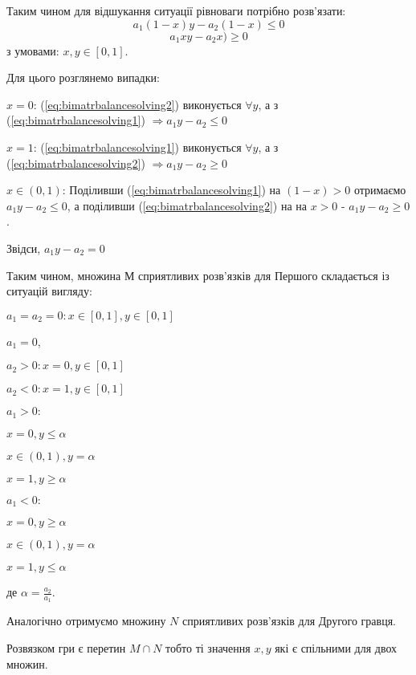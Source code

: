 \documentclass[12pt,a4paper]{book}
\newenvironment{slim_enumerate}{
\begin{enumerate}
  \setlength{\itemsep}{1pt}
  \setlength{\parskip}{0pt}
  \setlength{\parsep}{0pt}}
{\end{enumerate}}
\newenvironment{slim_itemize}{
\begin{itemize}
  \setlength{\itemsep}{1pt}
  \setlength{\parskip}{0pt}
  \setlength{\parsep}{0pt}}
{\end{itemize}}
\begin{document}
Таким чином для відшукання ситуації рівноваги потрібно розв’язати:
\begin{equation} a_1(1-x)y - a_2(1-x) \leq 0 \label{eq:bimatrbalancesolving1} \end{equation}
\begin{equation} a_1xy - a_2x) \geq 0 \label{eq:bimatrbalancesolving2} \end{equation}
з умовами: $x,y \in [0,1]$.

Для цього розглянемо випадки:
\begin{slim_enumerate}
  \item $x=0$: (\ref{eq:bimatrbalancesolving2}) виконується $\forall y$, а з (\ref{eq:bimatrbalancesolving1}) $\Rightarrow a_1 y - a_2 \leq 0$
  \item $x=1$: (\ref{eq:bimatrbalancesolving1}) виконується $\forall y$, а з (\ref{eq:bimatrbalancesolving2}) $\Rightarrow a_1 y - a_2 \geq 0$
  \item $x \in (0,1)$: Поділивши (\ref{eq:bimatrbalancesolving1}) на $(1-x)>0$ отримаємо $a_1 y - a_2 \leq 0$, а поділивши (\ref{eq:bimatrbalancesolving2}) на на $x>0$ - $a_1 y - a_2 \geq 0$.

Звідси, $a_1 y - a_2 = 0$
\end{slim_enumerate}

Таким чином, множина $М$ сприятливих розв’язків для Першого складається із ситуацій вигляду:
\begin{slim_itemize}
  \item $a_1=a_2=0: x \in [0,1], y \in [0,1]$
  \item $a_1=0$,
  \begin{slim_enumerate}
    \item $a_2>0: x=0, y \in [0,1]$
    \item $a_2<0: x=1, y \in [0,1]$
  \end{slim_enumerate}
    \item $a_1>0:$
    \begin{slim_itemize}
      \item $x=0, y \leq \alpha$
      \item $x \in (0,1), y=\alpha$
      \item $x=1, y \geq \alpha$
    \end{slim_itemize}
    \item $a_1<0:$
    \begin{slim_itemize}
      \item $x=0, y \geq \alpha$
      \item $x \in (0,1), y=\alpha$
      \item $x=1, y \leq \alpha$
    \end{slim_itemize}
\end{slim_itemize}
де $\displaystyle \alpha = \frac{a_2}{a_1}$.

Аналогічно отримуємо множину $N$ сприятливих розв’язків для Другого гравця.

Розвязком гри є перетин $M \cap N$ тобто ті значення $x,y$ які є спільними для двох множин.
\end{document}
